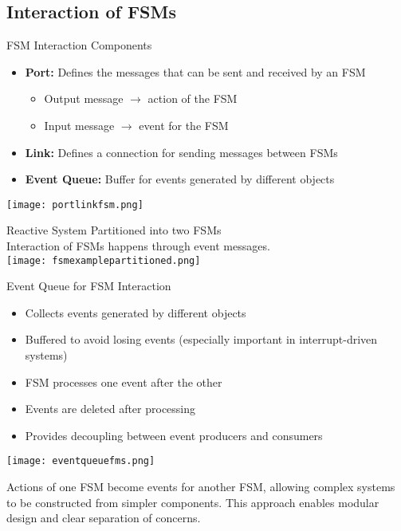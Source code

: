 \subsection{Interaction of FSMs}

\begin{definition}{FSM Interaction Components}
\begin{itemize}
    \item \textbf{Port:} Defines the messages that can be sent and received by an FSM
        \begin{itemize}
            \item Output message $\rightarrow$ action of the FSM
            \item Input message $\rightarrow$ event for the FSM
        \end{itemize}
    \item \textbf{Link:} Defines a connection for sending messages between FSMs
    \item \textbf{Event Queue:} Buffer for events generated by different objects
\end{itemize}
\texttt{[image: portlinkfsm.png]}
\end{definition}

\begin{example2}{Reactive System Partitioned into two FSMs}\\
    Interaction of FSMs happens through event messages.\\
\texttt{[image: fsmexamplepartitioned.png]}
\end{example2}

\begin{concept}{Event Queue for FSM Interaction}
\begin{itemize}
    \item Collects events generated by different objects
    \item Buffered to avoid losing events (especially important in interrupt-driven systems)
    \item FSM processes one event after the other
    \item Events are deleted after processing
    \item Provides decoupling between event producers and consumers
\end{itemize}
\texttt{[image: eventqueuefms.png]}

Actions of one FSM become events for another FSM, allowing complex systems to be constructed from simpler components. This approach enables modular design and clear separation of concerns.
\end{concept}



